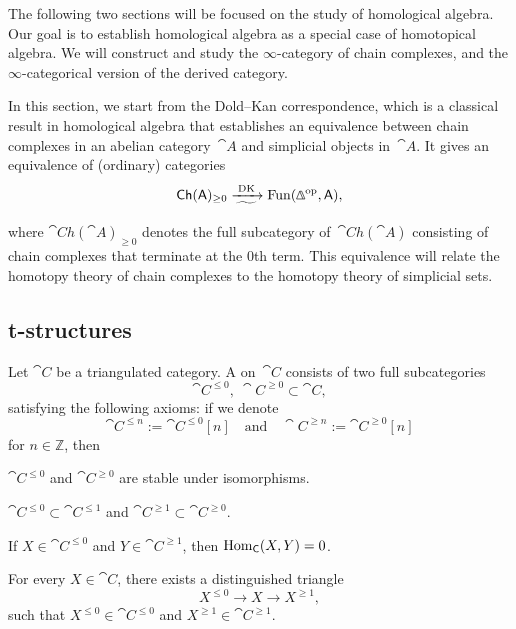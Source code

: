 The following two sections will be focused on 
the study of homological algebra. 
Our goal is to establish homological algebra 
as a special case of homotopical algebra.
We will construct and study the $\infty$-category of chain complexes,
and the $\infty$-categorical version of the derived category.

In this section, we start from the Dold--Kan correspondence,
which is a classical result in homological algebra
that establishes an equivalence
between chain complexes in an abelian category~$\cat{A}$
and simplicial objects in~$\cat{A}$.
It gives an equivalence of (ordinary) categories
\[ \cat{Ch}(\cat{A})_{\geq0}\xrightarrow[\textstyle\widetilde{\phantom{......}}]{\operatorname{DK}}
\operatorname{Fun}(\bfDelta\op,\cat{A}), \]
where $\cat{Ch}(\cat{A})_{\geq0}$ denotes the full subcategory of~$\cat{Ch}(\cat{A})$
consisting of chain complexes that terminate at the $0$th term.
This equivalence will
relate the homotopy theory of chain complexes
to the homotopy theory of simplicial sets.

\subsection{t-structures}

\begin{definition}
    Let $\cat{C}$ be a triangulated category.
    A  on~$\cat{C}$ consists of two full subcategories
    \[ \cat{C}^{\leq0},\ \cat{C}^{\geq0}\subset\cat C, \]
    satisfying the following axioms: if we denote
    \[ \cat{C}^{\leq n}:=\cat{C}^{\leq0}[n]\quad\text{and}\quad
    \cat{C}^{\geq n}:=\cat{C}^{\geq0}[n] \]
    for $n\in\mathbb Z$, then
    \begin{itms}
        \item $\cat{C}^{\leq0}$ and $\cat{C}^{\geq0}$
        are stable under isomorphisms.
        \item $\cat{C}^{\leq0}\subset\cat{C}^{\leq1}$ and $\cat{C}^{\geq1}\subset\cat{C}^{\geq0}$.
        \item If $X\in\cat{C}^{\leq0}$ and $Y\in\cat{C}^{\geq1}$, then
        $\operatorname{Hom}_{\mathsf{C}}(X,Y)=0$.
        \item For every $X\in\cat{C}$, there exists a distinguished triangle 
        \[X^{\leq0}\to X\to X^{\geq1},\]
        such that $X^{\leq0}\in\cat{C}^{\leq0}$ and $X^{\geq1}\in\cat{C}^{\geq1}$.
    \end{itms}
\end{definition}

